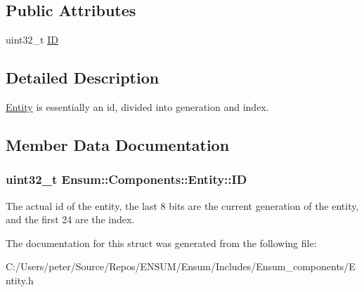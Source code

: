 \subsection*{Public Attributes}
\begin{DoxyCompactItemize}
\item 
uint32\+\_\+t \hyperlink{struct_ensum_1_1_components_1_1_entity_a89fe2a4a8002457a754b7ba63804bf2a}{ID}
\end{DoxyCompactItemize}


\subsection{Detailed Description}
\hyperlink{struct_ensum_1_1_components_1_1_entity}{Entity} is essentially an id, divided into generation and index. 

\subsection{Member Data Documentation}
\subsubsection[{\texorpdfstring{ID}{ID}}]{\setlength{\rightskip}{0pt plus 5cm}uint32\+\_\+t Ensum\+::\+Components\+::\+Entity\+::\+ID}\hypertarget{struct_ensum_1_1_components_1_1_entity_a89fe2a4a8002457a754b7ba63804bf2a}{}\label{struct_ensum_1_1_components_1_1_entity_a89fe2a4a8002457a754b7ba63804bf2a}
The actual id of the entity, the last 8 bits are the current generation of the entity, and the first 24 are the index. 

The documentation for this struct was generated from the following file\+:\begin{DoxyCompactItemize}
\item 
C\+:/\+Users/peter/\+Source/\+Repos/\+E\+N\+S\+U\+M/\+Ensum/\+Includes/\+Ensum\+\_\+components/Entity.\+h\end{DoxyCompactItemize}
